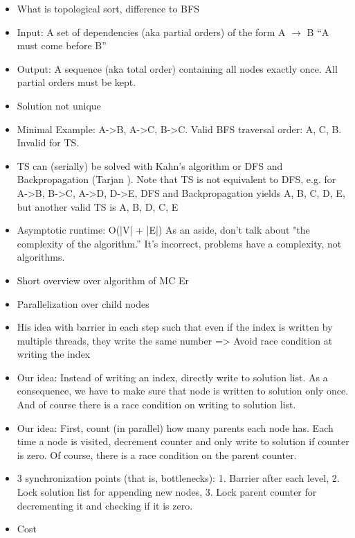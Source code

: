  
 \begin{invisible}
 \begin{itemize}
  \item What is topological sort, difference to BFS
  \item Input: A set of dependencies (aka partial orders) of the form A $\rightarrow$ B ``A must come before B''
  \item Output: A sequence (aka total order) containing all nodes exactly once. All partial orders must be kept.
  \item Solution not unique
  \item Minimal Example: A->B, A->C, B->C. Valid BFS traversal order: A, C, B. Invalid for TS.
  \item TS can (serially) be solved with Kahn's algorithm \cite{kahn1962topological} or DFS and Backpropagation (Tarjan \cite{tarjan1976edge}). %
        Note that TS is not equivalent to DFS, e.g. for A->B, B->C, A->D, D->E, DFS and Backpropagation yields A, B, C, D, E, but another valid TS is A, B, D, C, E
  \item Asymptotic runtime: O(|V| + |E|)
As an aside, don't talk about "the complexity of the algorithm.'' It's incorrect,
problems have a complexity, not algorithms.  
 \end{itemize}

 \begin{itemize}
  \item Short overview over algorithm of MC Er
  \item Parallelization over child nodes
  \item His idea with barrier in each step such that even if the index is written by multiple threads, they write the same number => Avoid race condition at writing the index
  \item Our idea: Instead of writing an index, directly write to solution list. As a consequence, we have to make sure that node is written to solution only once. And of course there is a race condition on writing to solution list.
  \item Our idea: First, count (in parallel) how many parents each node has. Each time a node is visited, decrement counter and only write to solution if counter is zero. Of course, there is a race condition on the parent counter.
  \item 3 synchronization points (that is, bottlenecks): 1. Barrier after each level, 2. Lock solution list for appending new nodes, 3. Lock parent counter for decrementing it and checking if it is zero.
  \item Cost
 \end{itemize}

 
\end{invisible}